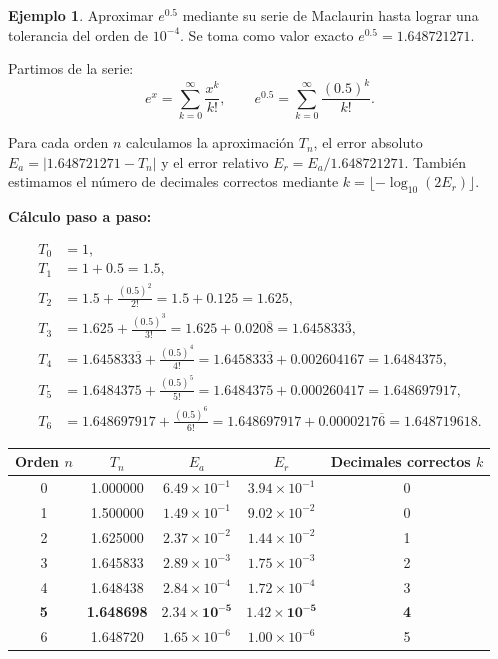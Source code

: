 \documentclass[a4paper,12pt]{article}
\theoremstyle{definition}
\newtheorem{ejemplo}{Ejemplo}[section]
\theoremstyle{plain}
\begin{document}
\begin{ejemplo}
\label{ej:exp05}
Aproximar $e^{0.5}$ mediante su serie de Maclaurin hasta lograr una tolerancia
del orden de $10^{-4}$. Se toma como valor exacto $e^{0.5} = 1.648721271$.

Partimos de la serie:
\[
    e^x = \sum_{k=0}^{\infty} \frac{x^k}{k!},
    \qquad
    e^{0.5} = \sum_{k=0}^{\infty} \frac{(0.5)^k}{k!}.
\]

Para cada orden $n$ calculamos la aproximación $T_n$, el error absoluto
$E_a = |1.648721271 - T_n|$ y el error relativo $E_r = E_a / 1.648721271$.
También estimamos el número de decimales correctos mediante
$k = \lfloor -\log_{10}(2E_r)\rfloor$.

\medskip
\textbf{Cálculo paso a paso:}

\begin{align*}
T_0 &= 1, \\
T_1 &= 1 + 0.5 = 1.5, \\
T_2 &= 1.5 + \frac{(0.5)^2}{2!} = 1.5 + 0.125 = 1.625, \\
T_3 &= 1.625 + \frac{(0.5)^3}{3!} = 1.625 + 0.020\overline{8}
     = 1.645833\overline{3}, \\
T_4 &= 1.645833\overline{3} + \frac{(0.5)^4}{4!}
     = 1.645833\overline{3} + 0.002604167 = 1.6484375, \\
T_5 &= 1.6484375 + \frac{(0.5)^5}{5!}
     = 1.6484375 + 0.000260417 = 1.648697917, \\
T_6 &= 1.648697917 + \frac{(0.5)^6}{6!}
     = 1.648697917 + 0.0000217\overline{6} = 1.648719618.
\end{align*}

\medskip
\begin{center}
\begin{tabular}{ccccc}
\toprule
Orden $n$ & $T_n$ & $E_a$ & $E_r$ & Decimales correctos $k$ \\
\midrule
0 & 1.000000 & $6.49 \times 10^{-1}$ & $3.94 \times 10^{-1}$ & 0 \\
1 & 1.500000 & $1.49 \times 10^{-1}$ & $9.02 \times 10^{-2}$ & 0 \\
2 & 1.625000 & $2.37 \times 10^{-2}$ & $1.44 \times 10^{-2}$ & 1 \\
3 & 1.645833 & $2.89 \times 10^{-3}$ & $1.75 \times 10^{-3}$ & 2 \\
4 & 1.648438 & $2.84 \times 10^{-4}$ & $1.72 \times 10^{-4}$ & 3 \\
\textbf{5} & \textbf{1.648698} & $\mathbf{2.34 \times 10^{-5}}$
           & $\mathbf{1.42 \times 10^{-5}}$ & \textbf{4} \\
6 & 1.648720 & $1.65 \times 10^{-6}$ & $1.00 \times 10^{-6}$ & 5 \\
\bottomrule
\end{tabular}
\end{center}


\end{ejemplo}
\end{document}
